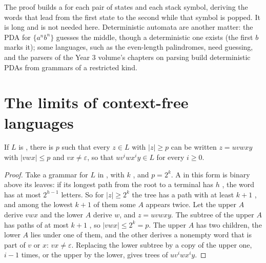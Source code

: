 \admitted

The proof builds a  for each pair of states and each stack symbol, deriving the words that lead from the
first state to the second while that symbol is popped. It is long and is not needed here. Deterministic automata are
another matter: the PDA for $\{a^nb^n\}$ guesses the middle, though a deterministic one exists (the first $b$ marks it); some
languages, such as the even-length palindromes,
need guessing, and the parsers of the Year 3 volume's chapters on parsing build deterministic PDAs from grammars of a
restricted kind.

\section{The limits of context-free languages}\label{sec:b2:context-free-languages:limits}

\begin{theorem}\label{thm:b2:context-free-languages:pumping}
If $L$ is , there is $p$ such that every $z \in L$ with $|z| \ge p$ can be written $z = uvwxy$ with $|vwx|
\le p$ and $vx \ne \varepsilon$, so that $uv^iwx^iy \in L$ for every $i \ge 0$.
\end{theorem}

\begin{proof}
Take a grammar for $L$ in , with $k$ , and $p = 2^k$. A  in this form is
binary above its leaves: if its longest path from the root to a terminal has $h$ , the word has at most
$2^{h-1}$ letters. So for $|z| \ge 2^k$ the tree has a path with at least $k + 1$ , and among the lowest
$k + 1$ of them some $A$ appears twice. Let the upper $A$ derive $vwx$ and the lower $A$ derive $w$, and $z = uvwxy$.
The subtree of the upper $A$ has paths of at most $k + 1$ , so $|vwx| \le 2^k = p$. The upper $A$ has two
children, the lower $A$ lies under one of them, and the other derives a nonempty word that is part of $v$ or $x$: $vx
\ne \varepsilon$. Replacing the lower subtree by a copy of the upper one, $i - 1$ times, or the upper by the lower,
gives trees of $uv^iwx^iy$.
\end{proof}

